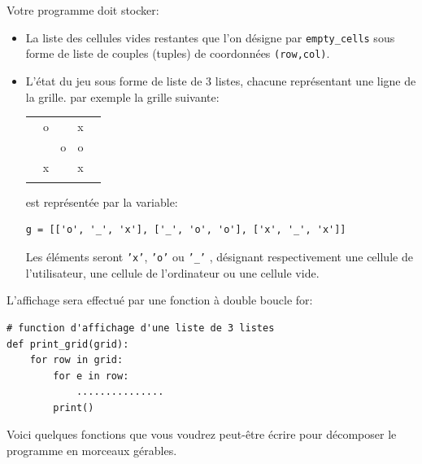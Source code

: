 \documentclass[a4paper]{article}
\begin{document}
Votre programme doit stocker:
\begin{itemize}
\item  La liste des cellules vides restantes que l'on désigne par {\tt empty\_cells} sous forme de liste de couples (tuples) de coordonnées {\tt (row,col)}.
\item  L'état du jeu sous forme de liste de 3 listes, chacune représentant une ligne de la grille. par exemple la grille suivante: 

\begin{center}
\begin{tabular}{c|c|c|c|c}
&& & & \\ \hline
&o& &x & \\ \hline
&&o &o & \\ \hline
&x& &x & \\ \hline
&& & &  \\
\end{tabular}
\end{center}
est représentée par la variable:
\begin{verbatim}
g = [['o', '_', 'x'], ['_', 'o', 'o'], ['x', '_', 'x']]
\end{verbatim}
Les éléments  seront {\tt 'x'}, {\tt 'o'} ou {\tt '\_'} , désignant respectivement une cellule de l'utilisateur, une cellule de l'ordinateur ou une cellule vide.
\end{itemize}
L'affichage sera effectué par une fonction à double boucle for:
\begin{lstlisting}
# function d'affichage d'une liste de 3 listes
def print_grid(grid):
    for row in grid:
        for e in row:
            ...............
        print()
\end{lstlisting}

Voici quelques fonctions que vous voudrez peut-être écrire pour décomposer le programme en morceaux gérables.
\end{document}
